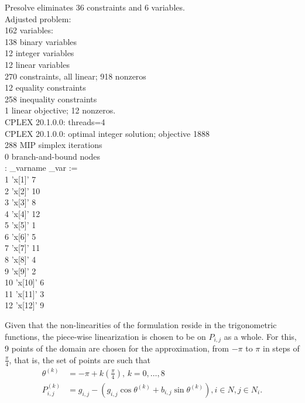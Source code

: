 \documentclass[a4paper]{report}
\newenvironment{alltt}{\ttfamily}{\par}
\begin{document}
\begin{alltt}
Presolve eliminates 36 constraints and 6 variables. \\
Adjusted problem: \\
162 variables: \\
\-\hspace{2cm}138 binary variables \\
\-\hspace{2cm}12 integer variables \\
\-\hspace{2cm}12 linear variables \\
270 constraints, all linear; 918 nonzeros \\
\-\hspace{2cm}12 equality constraints \\
\-\hspace{2cm}258 inequality constraints \\
1 linear objective; 12 nonzeros. \\

CPLEX 20.1.0.0: threads=4 \\
CPLEX 20.1.0.0: optimal integer solution; objective 1888 \\
288 MIP simplex iterations \\
0 branch-and-bound nodes \\
:      \_varname  \_var    := \\
1     'x[1]'        7 \\
2     'x[2]'       10 \\
3     'x[3]'        8 \\
4     'x[4]'       12 \\
5     'x[5]'        1 \\
6     'x[6]'        5 \\
7     'x[7]'       11 \\
8     'x[8]'        4 \\
9     'x[9]'        2 \\
10    'x[10]'       6 \\
11    'x[11]'       3 \\
12    'x[12]'       9 \\
\end{alltt}


Given that the non-linearities of the formulation reside in the trigonometric functions, the piece-wise linearization is chosen to be on $P_{i,j}$ as a whole. For this, 9 points of the domain are chosen for the approximation, from $-\pi$ to $\pi$ in steps of $\frac{\pi}{4}$, that is, the set of points are such that
\begin{align*}
    \theta^{(k)} &= -\pi + k\left(  \frac{\pi}{4} \right),\,k=0,\ldots,8  \\
    P^{(k)}_{i,j} &= g_{i,j} -\left( g_{i,j}\cos\theta^{(k)} + b_{i,j}\sin\theta^{(k)} \right), i \in N , j\in N_i
.\end{align*}
\end{document}

